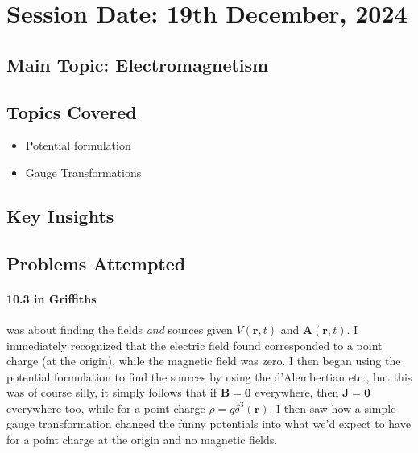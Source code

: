 \section{Session Date: 19th December, 2024}\label{19-12-24}
\subsection*{Main Topic: Electromagnetism}
\subsection*{Topics Covered}
\begin{itemize}
    \item Potential formulation
    \item Gauge Transformations
\end{itemize}

\subsection*{Key Insights}
\subsection*{Problems Attempted}
\paragraph{10.3 in Griffiths} was about finding the fields \textit{and} sources given \(V(\mathbf{r}, t)\) and \(\mathbf{A}(\mathbf{r}, t)\). I immediately recognized that the electric field found corresponded to a point charge (at the origin), while the magnetic field was zero. I then began using the potential formulation to find the sources by using the d'Alembertian etc., but this was of course silly, it simply follows that if \(\mathbf{B} = \mathbf{0}\) everywhere, then \(\mathbf{J} = \mathbf{0}\) everywhere too, while for a point charge \(\rho = q \delta ^3 (\mathbf{r})\). I then saw how a simple gauge transformation changed the funny potentials into what we'd expect to have for a point charge at the origin and no magnetic fields.

